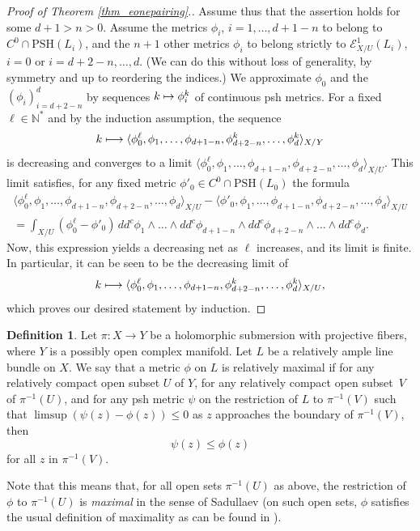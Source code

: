 \documentclass[JEP,XML,SOM,Unicode,NoEqCountersInSection,published]{cedram}
\def\mto{\mathchoice{\longmapsto}{\mapsto}{\mapsto}{\mapsto}}
\theoremstyle{definition}
\newtheorem{defi}[theorem]{Definition}
\newcommand\cE{\mathcal{E}}
\newcommand\mi{^{-1}}
\newcommand\PSH{\mathrm{PSH}}
\begin{document}
\begin{proof}[Proof of Theorem \ref{thm_eonepairing}.]
Assume thus that the assertion holds for some $d+1>n>0$. Assume the metrics $\phi_i$, $i=1,\dots,d+1-n$ to belong to $C^0\cap\PSH(L_i)$, and the $n+1$ other metrics $\phi_i$ to belong strictly to $\cE^1_{X/U}(L_i)$, $i=0$ or $i=d+2-n,\dots,d$. (We can do this without loss of generality, by symmetry and up to reordering the indices.) We approximate $\phi_0$ and the $(\phi_i)_{i=d+2-n}^{d}$ by sequences $k\mto \phi_i^k$ of continuous psh metrics. For a fixed $\ell\in\mathbb{N}^*$ and by the induction assumption, the sequence
\[
k\mto \langle \phi_0^\ell,\phi_1,\dots,\phi_{d+1-n},\phi^k_{d+2-n},\dots,\phi^k_{d}\rangle_{X/Y}
\]
is decreasing and converges to a limit
$\langle \phi_0^\ell,\phi_1,\dots,\phi_{d+1-n},\phi_{d+2-n},\dots,\phi_{d}\rangle_{X/U}$. This limit satisfies, for any fixed metric $\phi'_0\in C^0\cap\PSH(L_0)$ the formula
\begin{multline*}
\langle \phi_0^\ell,\phi_1,\dots,\phi_{d+1-n},\phi_{d+2-n},\dots,\phi_{d}\rangle_{X/U}-\langle \phi'_0,\phi_1,\dots,\phi_{d+1-n},\phi_{d+2-n},\dots,\phi_{d}\rangle_{X/U}\\
=\int_{X/U}(\phi_0^\ell-\phi'_0)\,dd^c\phi_1\wedge\dots\wedge dd^c\phi_{d+1-n}\wedge dd^c\phi_{d+2-n}\wedge\dots\wedge dd^c\phi_{d}.
\end{multline*}
Now, this expression yields a decreasing net as $\ell$ increases, and its limit is finite. In particular, it can be seen to be the decreasing limit of
\[
k\mto \langle \phi_0^\ell,\phi_1,\dots,\phi_{d+1-n},\phi^k_{d+2-n},\dots,\phi^k_{d}\rangle_{X/U},
\]
which proves our desired statement by induction.
\end{proof}

\label{sect_relmax}

\begin{defi}
Let $\pi:X\to Y$ be a holomorphic submersion with projective fibers, where $Y$ is a possibly open complex manifold. Let $L$ be a relatively ample line bundle on $X$. We say that a metric $\phi$ on $L$ is relatively maximal if for any relatively compact open subset $U$ of $Y$, for any relatively compact open subset~$V$ of $\pi\mi(U)$, and for any psh metric $\psi$ on the restriction of $L$ to $\pi\mi(V)$ such that $\limsup (\psi(z)-\phi(z))\leq 0$ as $z$ approaches the boundary of $\pi\mi(V)$, then
\[
\psi(z)\leq\phi(z)
\]
for all $z$ in $\pi\mi(V)$.
\end{defi}
Note that this means that, for all open sets $\pi\mi(U)$ as above, the restriction of $\phi$ to $\pi\mi(U)$ is \textit{maximal} in the sense of Sadullaev (\ie on such open sets, $\phi$ satisfies the usual definition of maximality as can be found in \eg \cite{klimek}).
\end{document}
